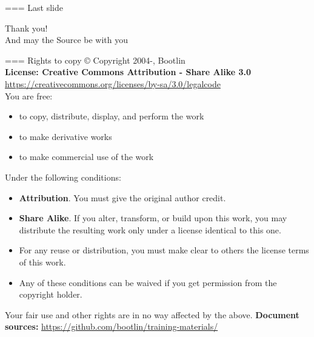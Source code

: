 === Last slide
  \begin{center}
    \Huge
    Thank you!\\
    \huge
    And may the Source be with you\\
  \end{center}


=== Rights to copy
   \scriptsize
   © Copyright 2004-\the\year, Bootlin \\
   {\bf License: Creative Commons Attribution - Share Alike 3.0} \\
   \url{https://creativecommons.org/licenses/by-sa/3.0/legalcode} \\

   You are free:
   \begin{itemize}
     \item to copy, distribute, display, and perform the work
     \item to make derivative works
     \item to make commercial use of the work
   \end{itemize}

   Under the following conditions:
   \begin{itemize}
     \item {\bf Attribution}. You must give the original author credit.
     \item {\bf Share Alike}. If you alter, transform, or build upon
           this work, you may distribute the resulting work only under
           a license identical to this one.
     \item For any reuse or distribution, you must make clear to others
           the license terms of this work.
     \item Any of these conditions can be waived if you get permission
           from the copyright holder.
    \end{itemize}

    Your fair use and other rights are in no way affected by the above.
    \vfill
    {\bf Document sources:}
    \url{https://github.com/bootlin/training-materials/} \\


\clearpage
{}%
\renewcommand*{\thepage}{A\arabic{page}}
\appendix
